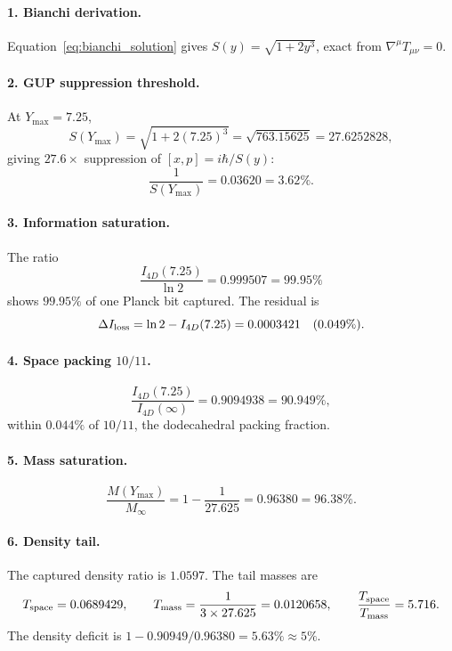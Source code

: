 \documentclass[a4paper,7pt,oneside,openany]{book}
\begin{document}
\paragraph{1. Bianchi derivation.} Equation~\eqref{eq:bianchi_solution} gives \(S(y) = \sqrt{1+2y^3}\), exact from \(\nabla^\mu T_{\mu\nu} = 0\).

\paragraph{2. GUP suppression threshold.} At \(Y_{\max} = 7.25\),
\begin{equation}
S(Y_{\max}) = \sqrt{1+2(7.25)^3} = \sqrt{763.15625} = 27.6252828,
\end{equation}
giving \(27.6\times\) suppression of \([x,p] = i\hbar/S(y)\):
\begin{equation}
\frac{1}{S(Y_{\max})} = 0.03620 = 3.62\%.
\end{equation}

\paragraph{3. Information saturation.} The ratio
\begin{equation}
\frac{I_{4D}(7.25)}{\ln 2} = 0.999507 = 99.95\%
\end{equation}
shows \(99.95\%\) of one Planck bit captured. The residual is
\begin{equation}
\Delta I_{\rm loss} = \ln 2 - I_{4D}(7.25) = 0.0003421 \quad (0.049\%).
\end{equation}

\paragraph{4. Space packing \(10/11\).} 
\begin{equation}
\frac{I_{4D}(7.25)}{I_{4D}(\infty)} = 0.9094938 = 90.949\%,
\end{equation}
within \(0.044\%\) of \(10/11\), the dodecahedral packing fraction.

\paragraph{5. Mass saturation.} 
\begin{equation}
\frac{M(Y_{\max})}{M_\infty} = 1 - \frac{1}{27.625} = 0.96380 = 96.38\%.
\end{equation}

\paragraph{6. Density tail.} The captured density ratio is \(1.0597\). The tail masses are
\begin{equation}
T_{\rm space} = 0.0689429, \qquad T_{\rm mass} = \frac{1}{3 \times 27.625} = 0.0120658, \qquad \frac{T_{\rm space}}{T_{\rm mass}} = 5.716.
\end{equation}
The density deficit is \(1 - 0.90949/0.96380 = 5.63\% \approx 5\%\).
\end{document}
